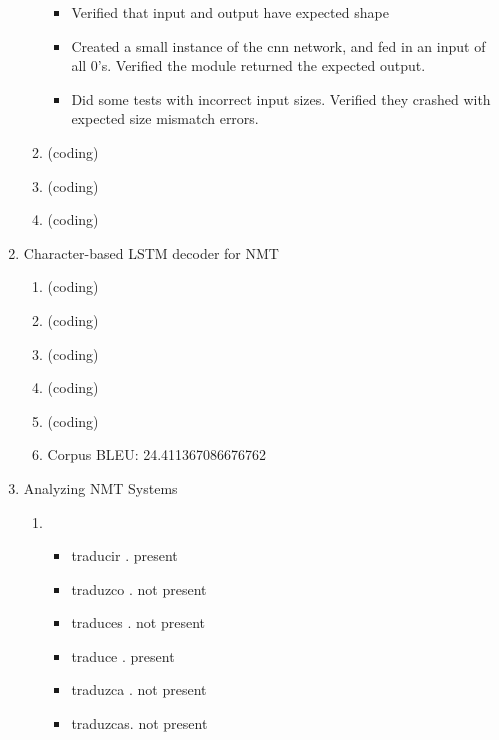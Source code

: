 \documentclass[]{article}
\begin{document}
\begin{enumerate}
\begin{enumerate}
		\begin{itemize}
				\item Verified that input and output have expected shape
				\item Created a small instance of the cnn network, and fed in an input of all 0's. Verified the module returned the expected output.
				\item Did some tests with incorrect input sizes. Verified they crashed with expected size mismatch errors.
		\end{itemize}
		
		\item
		(coding)
		
		\item
		(coding)
		
		\item
		(coding)
		
	\end{enumerate}
	
	\item Character-based LSTM decoder for NMT
	\begin{enumerate}
		\item
		(coding)
		
		\item
		(coding)
		
		\item
		(coding)
		
		\item
		(coding)
		
		\item
		(coding)
		
		\item
		Corpus BLEU: 24.411367086676762
		
	\end{enumerate}
	
	\item Analyzing NMT Systems
	\begin{enumerate}
		\item
		
		\begin{itemize}
				\item traducir . present
				\item traduzco . not present
				\item traduces . not present
				\item traduce  . present
				\item traduzca . not present
				\item traduzcas. not present
		\end{itemize}
		

\end{enumerate}
\end{enumerate}
\end{document}
